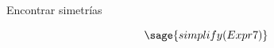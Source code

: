 \documentclass[handout,hyperref={colorlinks=true}]{beamer}
\renewcommand{\emph}[1]{\textcolor[rgb]{1,0,0}{#1}}
\newcommand{\nl}{\onslide<+-> }
\begin{document}
\begin{frame}[fragile]{Encontrar simetrías}

\[\sage{simplify(Expr7)}\]
\end{frame}















\end{document}
